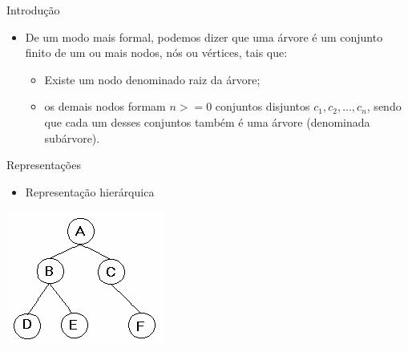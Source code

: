 \documentclass[12pt,table,xcolor={dvipsnames}]{beamer}
\begin{document}
\begin{frame}[fragile]{Introdução}
\begin{itemize}
\item De um modo mais formal, podemos dizer que uma árvore é um conjunto finito de um ou mais nodos, nós ou vértices, tais que:
\begin{itemize}
\item  Existe um nodo denominado raiz da árvore;
\item  os demais nodos formam $n >= 0$ conjuntos disjuntos $c_1, c_2, ..., c_n$, sendo que cada um desses conjuntos também é uma árvore (denominada subárvore).
\end{itemize}
\end{itemize}
\end{frame}

\begin{frame}[fragile]{Representações}
          \begin{itemize}
		  \item Representação hierárquica
          \end{itemize}
          \begin{center}
          \includegraphics[scale=1]{tree.png} 
          \end{center}
\end{frame}
 
\end{document}
